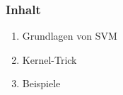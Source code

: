 \begin{frame}
    \frametitle{Inhalt}

    \begin{enumerate}
        \item Grundlagen von SVM
        \item Kernel-Trick
        \item Beispiele
    \end{enumerate}
\end{frame}

